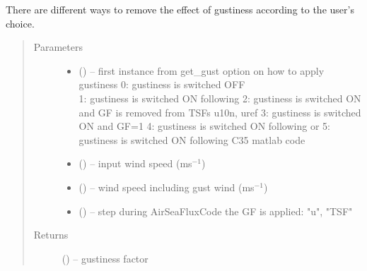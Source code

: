 \documentclass[letterpaper,10pt,english]{sphinxmanual}
\begin{document}

\begin{fulllineitems}
\label{\detokenize{index:flux_subs.apply_GF}}
There are different ways to remove the effect of gustiness according to the user's choice.
\begin{quote}\begin{description}
\item[{Parameters}] \leavevmode\begin{itemize}
\item {} 
 (\href{https://docs.python.org/3/library/functions.html\#float}{}) -- first instance from get\_gust
        option on how to apply gustiness
        0: gustiness is switched OFF \\
        1: gustiness is switched ON following \cite{Fairall_etal_2003}
        2: gustiness is switched ON and GF is removed from TSFs u10n, uref
        3: gustiness is switched ON and GF=1
        4: gustiness is switched ON following \cite{Zeng_etal_1998} or \cite{Brodeau_etal_2006}
        5: gustiness is switched ON following C35 matlab code

\item {} 
 (\href{https://docs.python.org/3/library/functions.html\#float}{}) -- input wind speed (ms$^{-1}$)

\item {} 
 (\href{https://docs.python.org/3/library/functions.html\#float}{}) -- wind speed including gust wind (ms$^{-1}$)

\item {} 
 (\href{https://docs.python.org/3/library/functions.html\#str}{}) -- step during AirSeaFluxCode the GF is applied: "u", "TSF"

\end{itemize}

\item[{Returns}] \leavevmode
{} (\href{https://docs.python.org/3/library/functions.html\#float}{}) -- gustiness factor

\end{description}\end{quote}

\end{fulllineitems}
\end{document}
